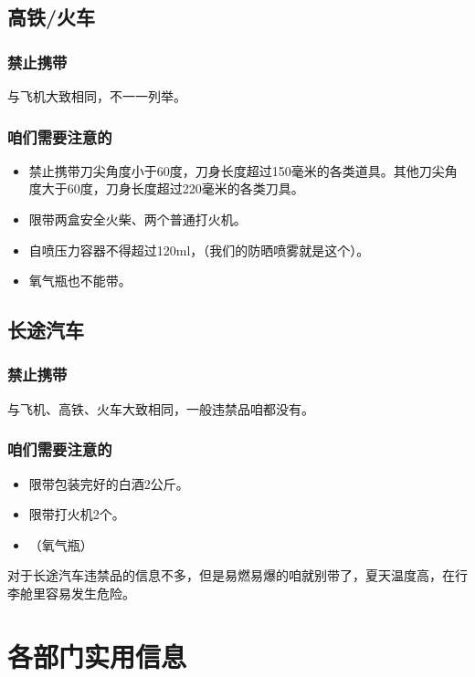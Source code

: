 \documentclass{ctexbook}
\begin{document}
\section{高铁/火车}
\subsection{禁止携带}
与飞机大致相同，不一一列举。
\subsection{咱们需要注意的}
\begin{itemize}
    \item 禁止携带刀尖角度小于60度，刀身长度超过150毫米的各类道具。其他刀尖角度大于60度，刀身长度超过220毫米的各类刀具。
    \item 限带两盒安全火柴、两个普通打火机。
    \item 自喷压力容器不得超过120ml，（我们的防晒喷雾就是这个）。
    \item 氧气瓶也不能带。
\end{itemize}
\section{长途汽车}
\subsection{禁止携带}
与飞机、高铁、火车大致相同，一般违禁品咱都没有。
\subsection{咱们需要注意的}
\begin{itemize}
    \item 限带包装完好的白酒2公斤。
    \item 限带打火机2个。
    \item （氧气瓶）
\end{itemize}
对于长途汽车违禁品的信息不多，但是易燃易爆的咱就别带了，夏天温度高，在行李舱里容易发生危险。
\chapter{各部门实用信息}
\end{document}
